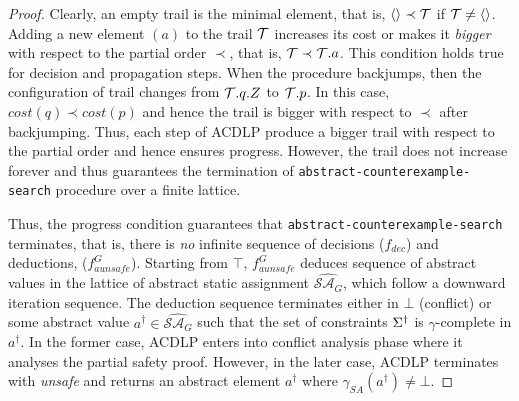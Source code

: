 \begin{proof}
Clearly, an empty trail is the minimal element, that is, $\langle \rangle \prec \mathcal{T}$ if 
$\mathcal{T} \neq \langle \rangle$.  Adding a new element $(a)$ to the trail $\mathcal{T}$ 
increases its cost or makes it \emph{bigger} with respect to the partial order $\prec$, that is, 
$\mathcal{T} \prec \mathcal{T}.a$.  This condition holds true for decision and propagation steps.   
When the procedure backjumps, then the configuration of trail changes from $\mathcal{T}.q.Z$ to $\mathcal{T}.p$.  
In this case, $cost(q) \prec cost(p)$ and hence the trail is bigger with respect to $\prec$ 
after backjumping.  Thus, each step of ACDLP produce a bigger trail with respect to the partial 
order and hence ensures progress. However, the trail does not increase forever and thus guarantees 
the termination of \texttt{abstract-counterexample-search} procedure over a finite lattice.


Thus, the progress condition guarantees that \texttt{abstract-counterexample-search} 
terminates, that is, there is \emph{no} infinite sequence of decisions 
($f_{dec}$) and deductions, ($f_{aunsafe}^G$).  Starting from $\top$, 
$f_{aunsafe}^G$ deduces sequence of abstract values 
in the lattice of abstract static assignment $\widehat{\mathcal{SA}_G}$, which follow a 
downward iteration sequence.
The deduction sequence terminates either in $\bot$ 
(conflict) or some abstract value $a^\dagger \in \widehat{\mathcal{SA}_G}$ such that 
the set of constraints $\Sigma^\dagger$ is $\gamma$-complete in $a^\dagger$.  
In the former case, ACDLP enters into conflict analysis phase where 
it analyses the partial safety proof.  However, in the later case, ACDLP 
terminates with \emph{unsafe} and returns an abstract element $a^\dagger$ where 
$\gamma_{SA}(a^{\dagger}) \neq \bot$.  




\end{proof}
